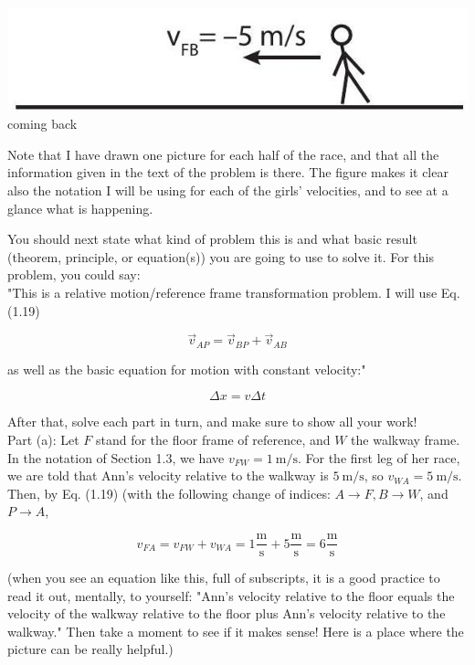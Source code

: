 \documentclass[10pt]{article}
\begin{document}
\includegraphics[max width=\textwidth, center]{2024_09_14_9969b06773f10b6936e8g-042}\\
coming back

Note that I have drawn one picture for each half of the race, and that all the information given in the text of the problem is there. The figure makes it clear also the notation I will be using for each of the girls' velocities, and to see at a glance what is happening.

You should next state what kind of problem this is and what basic result (theorem, principle, or equation(s)) you are going to use to solve it. For this problem, you could say:\\
"This is a relative motion/reference frame transformation problem. I will use Eq. (1.19)

$$
\vec{v}_{A P}=\vec{v}_{B P}+\vec{v}_{A B}
$$

as well as the basic equation for motion with constant velocity:"

$$
\Delta x=v \Delta t
$$

After that, solve each part in turn, and make sure to show all your work!\\
Part (a): Let $F$ stand for the floor frame of reference, and $W$ the walkway frame. In the notation of Section 1.3, we have $v_{F W}=1 \mathrm{~m} / \mathrm{s}$. For the first leg of her race, we are told that Ann's velocity relative to the walkway is $5 \mathrm{~m} / \mathrm{s}$, so $v_{W A}=5 \mathrm{~m} / \mathrm{s}$. Then, by Eq. (1.19) (with the following change of indices: $A \rightarrow F, B \rightarrow W$, and $P \rightarrow A$,


\begin{equation*}
v_{F A}=v_{F W}+v_{W A}=1 \frac{\mathrm{m}}{\mathrm{s}}+5 \frac{\mathrm{m}}{\mathrm{s}}=6 \frac{\mathrm{m}}{\mathrm{s}} \tag{1.25}
\end{equation*}


(when you see an equation like this, full of subscripts, it is a good practice to read it out, mentally, to yourself: "Ann's velocity relative to the floor equals the velocity of the walkway relative to the floor plus Ann's velocity relative to the walkway." Then take a moment to see if it makes sense! Here is a place where the picture can be really helpful.)
\end{document}
